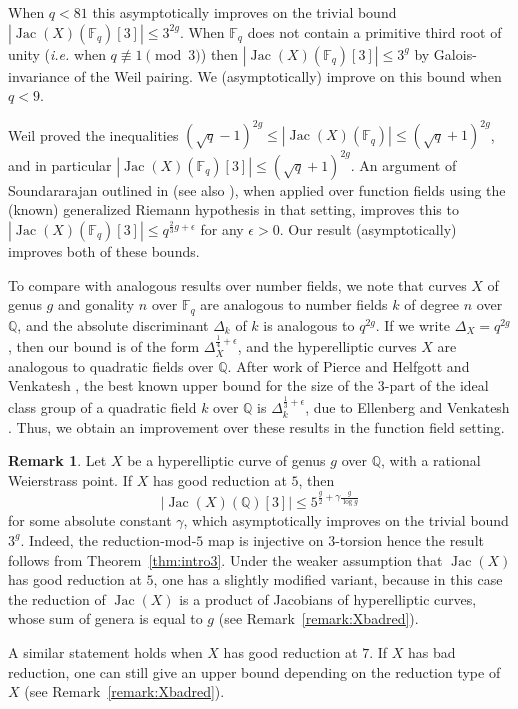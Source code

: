 \documentclass[11pt]{article}
\newcommand{\Q}{\ensuremath{\mathbb{Q}}}
\theoremstyle{plain}
\theoremstyle{definition}
\newtheorem{remark}[theorem]{Remark}
\DeclareMathOperator{\Jac}{Jac}
\begin{document}
When $q<81$ this asymptotically improves on the trivial bound $|\Jac(X)(\mathbb{F}_q)[3]|\leq 3^{2g}$. 
When $\mathbb{F}_q$ does not contain a primitive third root of unity (\emph{i.e.} when $q\not\equiv 1\pmod{3}$) then $|\Jac(X)(\mathbb{F}_q)[3]|\leq 3^{g}$ by Galois-invariance of the Weil pairing. We (asymptotically) improve on this bound when $q<9$.

Weil \cite{Weil} proved the inequalities $(\sqrt{q}-1)^{2g}\leq |\Jac(X)(\mathbb{F}_q)|\leq (\sqrt{q}+1)^{2g}$, and in particular $|\Jac(X)(\mathbb{F}_q)[3]|\leq (\sqrt{q}+1)^{2g}$. An argument of Soundararajan outlined in \cite[p.~19]{HV} (see also \cite{Yudovina}), when applied over function fields using the (known) generalized Riemann hypothesis in that setting, improves this to $|\Jac(X)(\mathbb{F}_q)[3]|\leq q^{\frac{2}{3}g+\epsilon}$ for any $\epsilon>0$. Our result (asymptotically) improves  both of these bounds.

To compare with analogous results over number fields, we note that curves $X$ of genus $g$ and gonality $n$ over $\mathbb{F}_q$ are analogous to number fields $k$ of degree $n$ over $\mathbb{Q}$, and the absolute discriminant $\Delta_k$ of $k$ is analogous to $q^{2g}$. If we write $\Delta_X=q^{2g}$, then our bound is of the form $\Delta_X^{\frac{1}{4}+\epsilon}$, and the hyperelliptic curves $X$ are analogous to quadratic fields over $\mathbb{Q}$. After work of Pierce \cite{Pierce05,Pierce06} and Helfgott and Venkatesh \cite{HV}, the best known upper bound for the size of the $3$-part of the ideal class group of a quadratic field $k$ over $\mathbb{Q}$ is $\Delta_k^{\frac{1}{3}+\epsilon}$, due to Ellenberg and Venkatesh \cite{EV}. Thus, we obtain an improvement over these results in the function field setting.




\begin{remark}
\label{remark:goodreductiontrick}
Let $X$ be a hyperelliptic curve of genus $g$ over $\Q$, with a rational Weierstrass point. If $X$ has good reduction at $5$, then
$$
|\Jac(X)(\Q)[3]|\leq 5^{\frac{g}{2}+\gamma\frac{g}{\log g}}
$$
for some absolute constant $\gamma$, which asymptotically improves on the trivial bound $3^g$. Indeed, the reduction-mod-$5$ map is injective on $3$-torsion hence the result follows from Theorem~\ref{thm:intro3}. Under the weaker assumption that $\Jac(X)$ has good reduction at $5$, one has a slightly modified variant, because in this case the reduction of $\Jac(X)$ is a product of Jacobians of hyperelliptic curves, whose sum of genera is equal to $g$ (see Remark~\ref{remark:Xbadred}).

A similar statement holds when $X$ has good reduction at $7$. If $X$ has bad reduction, one can still give an upper bound depending on the reduction type of $X$ (see Remark~\ref{remark:Xbadred}).
\end{remark}
\end{document}
